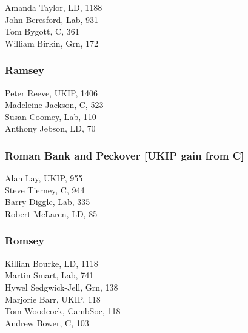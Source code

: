 \documentclass[a4paper,openany,10pt]{book}
\begin{document}


Amanda Taylor, LD, 1188\\
John Beresford, Lab, 931\\
Tom Bygott, C, 361\\
William Birkin, Grn, 172\\


\subsubsection*{Ramsey}



Peter Reeve, UKIP, 1406\\
Madeleine Jackson, C, 523\\
Susan Coomey, Lab, 110\\
Anthony Jebson, LD, 70\\


\subsubsection*{Roman Bank and Peckover \hspace*{\fill}\nolinebreak[1]%
\enspace\hspace*{\fill}
[UKIP gain from C]}



Alan Lay, UKIP, 955\\
Steve Tierney, C, 944\\
Barry Diggle, Lab, 335\\
Robert McLaren, LD, 85\\


\subsubsection*{Romsey}



Killian Bourke, LD, 1118\\
Martin Smart, Lab, 741\\
Hywel Sedgwick-Jell, Grn, 138\\
Marjorie Barr, UKIP, 118\\
Tom Woodcock, CambSoc, 118\\
Andrew Bower, C, 103\\
\end{document}
